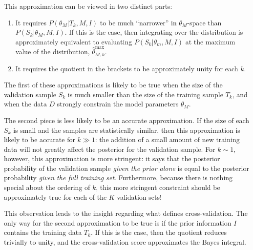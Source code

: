 \documentclass[12pt]{article}
\newcommand{\thetamax}[1]{\ensuremath{\hat{\theta}^{\max}_{#1}}}
\begin{document}
This approximation can be viewed in two distinct parts:
\begin{enumerate}
  \item It requires $P(\theta_M|T_k,M,I)$ to be much ``narrower''
    in $\theta_M$-space than $P(S_k|\theta_M, M, I)$.
    If this is the case, then integrating over the
    distribution is approximately equivalent to evaluating
    $P(S_k|\theta_m,M,I)$ at
    the maximum value of the distribution, \thetamax{M,k}.
  \item It requires the quotient in the brackets to be approximately unity
    for each $k$.
\end{enumerate}
The first of these approximations is likely to be true when the size of the
validation sample $S_k$ is much smaller than the size of the training sample
$T_k$, and when the data $D$ strongly constrain the model parameters
$\theta_M$.

The second piece is less likely to be an accurate approximation.
If the size of each $S_k$ is small and the samples are statistically similar,
then this approximation is likely to be accurate for $k \gg 1$:
the addition of a small amount of new training data will not greatly
affect the posterior for the validation sample.
For $k \sim 1$, however, this approximation is more stringent:
it says that the
posterior probability of the validation sample {\it given the prior alone}
is equal to the posterior probability {\it given the full training set}.
Furthermore, because there is nothing special about the ordering of $k$,
this more stringent constraint should be approximately true for
each of the $K$ validation sets!

This observation leads to the insight regarding what defines cross-validation.
The only way for the second approximation to be true is if the prior
information $I$ contains the training data $T_k$.  If this is the case, then
the quotient reduces trivially to unity, and the cross-validation score
approximates the Bayes integral.
\end{document}
